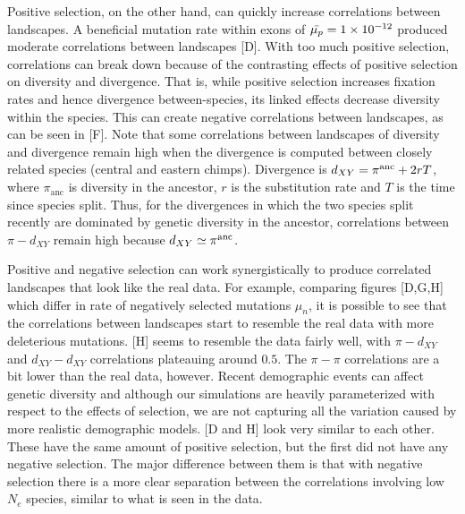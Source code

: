 Positive selection, on the other hand, can quickly increase correlations between landscapes.
A beneficial mutation rate within exons of $\bar{\mu_p}={1}\times10^{-12}$
produced moderate correlations between landscapes [D].
With too much positive selection, 
correlations can break down because of the contrasting effects of positive selection on diversity and divergence.
That is, while positive selection increases fixation rates and hence divergence between-species, its linked effects decrease diversity within the species.
This can create negative correlations between landscapes, as can be seen in [F].
Note that some correlations between landscapes of diversity and divergence remain high 
when the divergence is computed between closely related species (\eg central and eastern chimps).
Divergence is $d_{XY} = \pi^{\mathrm{anc}} + 2rT$, 
where $\pi_{\mathrm{anc}}$ is diversity in the ancestor, $r$ is the substitution rate and $T$ is the time since species split.
Thus, for the divergences in which the two species split recently are dominated by genetic diversity in the ancestor, correlations between $\pi-d_{XY}$ remain high because $d_{XY} \simeq \pi^{\mathrm{anc}}$.

Positive and negative selection can work synergistically to produce correlated landscapes that look like the real data.
For example, comparing figures [D,G,H] which differ in rate of negatively selected mutations $\mu_n$,
it is possible to see that the correlations between landscapes start to resemble the real data with more deleterious mutations.
[H] seems to resemble the data fairly well, with $\pi-d_{XY}$ and $d_{XY}-d_{XY}$ correlations plateauing around $0.5$.
The $\pi-\pi$ correlations are a bit lower than the real data, however. 
Recent demographic events can affect genetic diversity and although our simulations are heavily parameterized with respect to the effects of selection,
we are not capturing all the variation caused by more realistic demographic models.
[D and H] look very similar to each other.
These have the same amount of positive selection, but the first did not have any negative selection.
The major difference between them is that with negative selection there is a more clear separation between the correlations involving low $N_e$ species,
similar to what is seen in the data.

